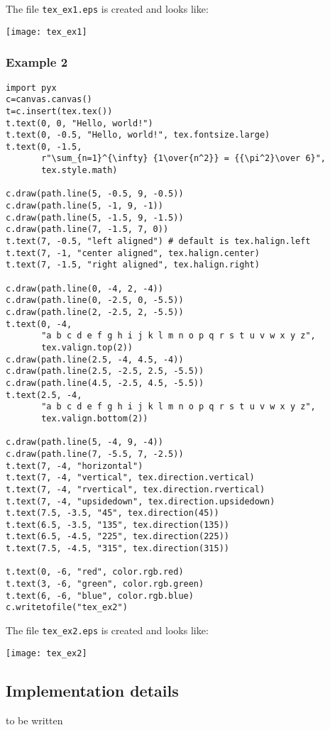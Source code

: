 The file \verb|tex_ex1.eps| is created and looks like:

\bigskip
\texttt{[image: tex\_ex1]}

\subsubsection{Example 2}
\begin{verbatim}
import pyx
c=canvas.canvas()
t=c.insert(tex.tex())
t.text(0, 0, "Hello, world!")
t.text(0, -0.5, "Hello, world!", tex.fontsize.large)
t.text(0, -1.5,
       r"\sum_{n=1}^{\infty} {1\over{n^2}} = {{\pi^2}\over 6}",
       tex.style.math)

c.draw(path.line(5, -0.5, 9, -0.5))
c.draw(path.line(5, -1, 9, -1))
c.draw(path.line(5, -1.5, 9, -1.5))
c.draw(path.line(7, -1.5, 7, 0))
t.text(7, -0.5, "left aligned") # default is tex.halign.left
t.text(7, -1, "center aligned", tex.halign.center)
t.text(7, -1.5, "right aligned", tex.halign.right)

c.draw(path.line(0, -4, 2, -4))
c.draw(path.line(0, -2.5, 0, -5.5))
c.draw(path.line(2, -2.5, 2, -5.5))
t.text(0, -4,
       "a b c d e f g h i j k l m n o p q r s t u v w x y z",
       tex.valign.top(2))
c.draw(path.line(2.5, -4, 4.5, -4))
c.draw(path.line(2.5, -2.5, 2.5, -5.5))
c.draw(path.line(4.5, -2.5, 4.5, -5.5))
t.text(2.5, -4,
       "a b c d e f g h i j k l m n o p q r s t u v w x y z",
       tex.valign.bottom(2))

c.draw(path.line(5, -4, 9, -4))
c.draw(path.line(7, -5.5, 7, -2.5))
t.text(7, -4, "horizontal")
t.text(7, -4, "vertical", tex.direction.vertical)
t.text(7, -4, "rvertical", tex.direction.rvertical)
t.text(7, -4, "upsidedown", tex.direction.upsidedown)
t.text(7.5, -3.5, "45", tex.direction(45))
t.text(6.5, -3.5, "135", tex.direction(135))
t.text(6.5, -4.5, "225", tex.direction(225))
t.text(7.5, -4.5, "315", tex.direction(315))

t.text(0, -6, "red", color.rgb.red)
t.text(3, -6, "green", color.rgb.green)
t.text(6, -6, "blue", color.rgb.blue)
c.writetofile("tex_ex2")
\end{verbatim}

The file \verb|tex_ex2.eps| is created and looks like:

\bigskip
\texttt{[image: tex\_ex2]}

\subsection{Implementation details}
to be written

